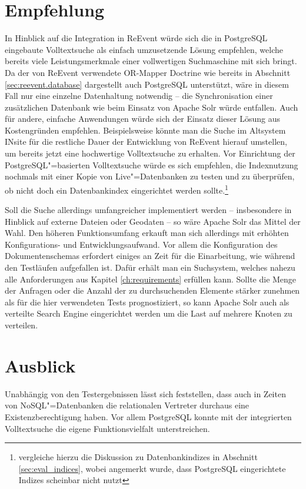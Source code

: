 \section{Empfehlung}

In Hinblick auf die Integration in ReEvent würde sich die in PostgreSQL eingebaute Volltextsuche als einfach umzusetzende Lösung empfehlen, welche bereits viele Leistungsmerkmale einer vollwertigen Suchmaschine mit sich bringt. Da der von ReEvent verwendete OR-Mapper Doctrine wie bereits in Abschnitt \ref{sec:reevent.database} dargestellt auch PostgreSQL unterstützt, wäre in diesem Fall nur eine einzelne Datenhaltung notwendig -- die Synchronisation einer zusätzlichen Datenbank wie beim Einsatz von Apache Solr würde entfallen. Auch für andere, einfache Anwendungen würde sich der Einsatz dieser Lösung aus Kostengründen empfehlen. Beispielsweise könnte man die Suche im Altsystem INsite für die restliche Dauer der Entwicklung von ReEvent hierauf umstellen, um bereits jetzt eine hochwertige Volltextsuche zu erhalten. Vor Einrichtung der PostgreSQL"=basierten Volltextsuche würde es sich empfehlen, die Indexnutzung nochmals mit einer Kopie von Live"=Datenbanken zu testen und zu überprüfen, ob nicht doch ein Datenbankindex eingerichtet werden sollte.\footnote{vergleiche hierzu die Diskussion zu Datenbankindizes in Abschnitt \ref{sec:eval_indices}, wobei angemerkt wurde, dass PostgreSQL eingerichtete Indizes scheinbar nicht nutzt}

Soll die Suche allerdings umfangreicher implementiert werden -- insbesondere in Hinblick auf externe Dateien oder Geodaten -- so wäre Apache Solr das Mittel der Wahl. Den höheren Funktionsumfang erkauft man sich allerdings mit erhöhten Konfigurations- und Entwicklungsaufwand. Vor allem die Konfiguration des Dokumentenschemas erfordert einiges an Zeit für die Einarbeitung, wie während den Testläufen aufgefallen ist. Dafür erhält man ein Suchsystem, welches nahezu alle Anforderungen aus Kapitel \ref{ch:requirements} erfüllen kann. Sollte die Menge der Anfragen oder die Anzahl der zu durchsuchenden Elemente stärker zunehmen als für die hier verwendeten Tests prognostiziert, so kann Apache Solr auch als verteilte Search Engine eingerichtet werden um die Last auf mehrere Knoten zu verteilen.

\section{Ausblick}

Unabhängig von den Testergebnissen lässt sich feststellen, dass auch in Zeiten von NoSQL"=Datenbanken die relationalen Vertreter durchaus eine Existenzberechtigung haben. Vor allem PostgreSQL konnte mit der integrierten Volltextsuche die eigene Funktionsvielfalt unterstreichen.

